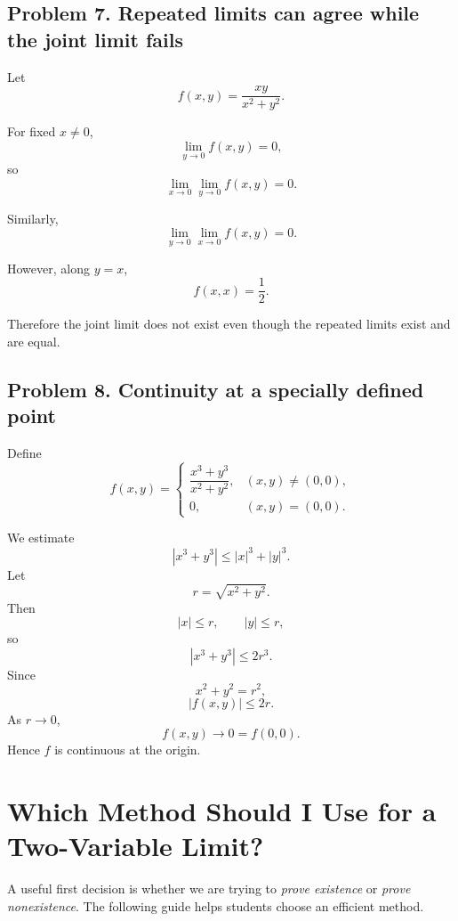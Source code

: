 \documentclass[11pt,oneside]{book}
\theoremstyle{studentthm}
\theoremstyle{definition}
\begin{document}
\subsection*{Problem 7. Repeated limits can agree while the joint limit fails}

Let
\[
f(x,y)
=
\frac{xy}{x^2+y^2}.
\]

For fixed \(x\ne0\),
\[
\lim_{y\to0}f(x,y)=0,
\]
so
\[
\lim_{x\to0}\lim_{y\to0}f(x,y)=0.
\]

Similarly,
\[
\lim_{y\to0}\lim_{x\to0}f(x,y)=0.
\]

However, along \(y=x\),
\[
f(x,x)=\frac12.
\]

Therefore the joint limit does not exist even though the repeated
limits exist and are equal.

\subsection*{Problem 8. Continuity at a specially defined point}

Define
\[
f(x,y)
=
\begin{cases}
\dfrac{x^3+y^3}{x^2+y^2},&(x,y)\ne(0,0),\\[1ex]
0,&(x,y)=(0,0).
\end{cases}
\]

We estimate
\[
|x^3+y^3|
\le
|x|^3+|y|^3.
\]
Let
\[
r=\sqrt{x^2+y^2}.
\]
Then
\[
|x|\le r,\qquad |y|\le r,
\]
so
\[
|x^3+y^3|\le2r^3.
\]
Since
\[
x^2+y^2=r^2,
\]
\[
|f(x,y)|
\le2r.
\]
As \(r\to0\),
\[
f(x,y)\to0=f(0,0).
\]
Hence \(f\) is continuous at the origin.



\section{Which Method Should I Use for a Two-Variable Limit?}

A useful first decision is whether we are trying to \emph{prove
existence} or \emph{prove nonexistence}. The following guide helps
students choose an efficient method.
\end{document}
